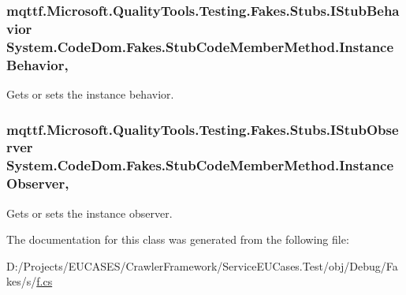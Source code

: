 \hypertarget{class_system_1_1_code_dom_1_1_fakes_1_1_stub_code_member_method_a33e997f7fa4936bf227517fb62f5f45a}{
\subsubsection[{Instance\-Behavior}]{\setlength{\rightskip}{0pt plus 5cm}mqttf.\-Microsoft.\-Quality\-Tools.\-Testing.\-Fakes.\-Stubs.\-I\-Stub\-Behavior System.\-Code\-Dom.\-Fakes.\-Stub\-Code\-Member\-Method.\-Instance\-Behavior\hspace{0.3cm}{\ttfamily [get]}, {\ttfamily [set]}}}\label{class_system_1_1_code_dom_1_1_fakes_1_1_stub_code_member_method_a33e997f7fa4936bf227517fb62f5f45a}


Gets or sets the instance behavior.

\hypertarget{class_system_1_1_code_dom_1_1_fakes_1_1_stub_code_member_method_ad664e22635389cf785c2a457118a716d}{
\subsubsection[{Instance\-Observer}]{\setlength{\rightskip}{0pt plus 5cm}mqttf.\-Microsoft.\-Quality\-Tools.\-Testing.\-Fakes.\-Stubs.\-I\-Stub\-Observer System.\-Code\-Dom.\-Fakes.\-Stub\-Code\-Member\-Method.\-Instance\-Observer\hspace{0.3cm}{\ttfamily [get]}, {\ttfamily [set]}}}\label{class_system_1_1_code_dom_1_1_fakes_1_1_stub_code_member_method_ad664e22635389cf785c2a457118a716d}


Gets or sets the instance observer.



The documentation for this class was generated from the following file\-:\begin{DoxyCompactItemize}
\item 
D\-:/\-Projects/\-E\-U\-C\-A\-S\-E\-S/\-Crawler\-Framework/\-Service\-E\-U\-Cases.\-Test/obj/\-Debug/\-Fakes/s/\hyperlink{s_2f_8cs}{f.\-cs}\end{DoxyCompactItemize}
